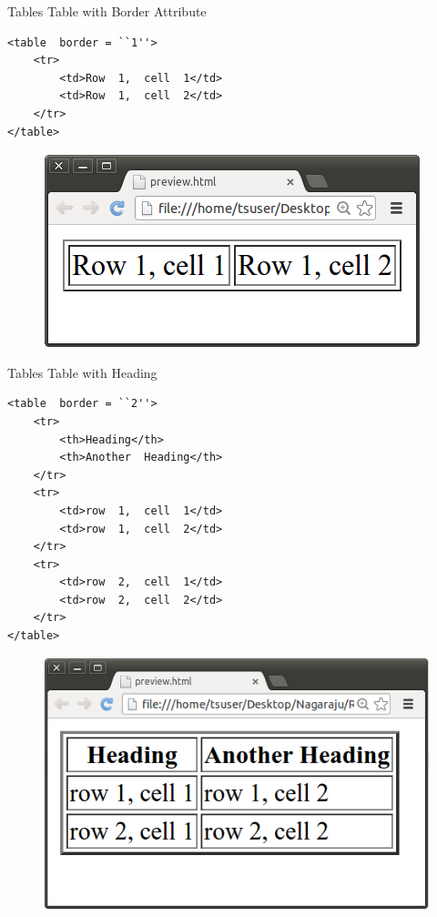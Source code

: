 \documentclass[14pt]{beamer}
\begin{document}
\begin{frame}[fragile]{Tables}
 Table with Border Attribute
 
\vspace{1pc}
\begin{minipage}{6cm}
\begin{lstlisting}
<table  border = ``1''>
    <tr>
        <td>Row  1,  cell  1</td>
        <td>Row  1,  cell  2</td>
    </tr>
</table>
\end{lstlisting}
\end{minipage}
\quad
\begin{minipage}{3cm}
 \begin{figure}[H]
  \includegraphics[scale=.3]{s02-tables-border.png}
 \end{figure}
\end{minipage}
\end{frame}

\begin{frame}[fragile]{Tables}
 Table with Heading
 
\begin{minipage}{7cm}
\begin{lstlisting}
<table  border = ``2''>
    <tr>
        <th>Heading</th>
        <th>Another  Heading</th>
    </tr>
    <tr>
        <td>row  1,  cell  1</td>
        <td>row  1,  cell  2</td>
    </tr>
    <tr>
        <td>row  2,  cell  1</td>
        <td>row  2,  cell  2</td>
    </tr>
</table>
\end{lstlisting}
\end{minipage}
\quad
\begin{minipage}{3cm}
\begin{figure}[H]
 \includegraphics[scale=.25]{tables-heading.png}
\end{figure}
\end{minipage}
\end{frame}
\end{document}
